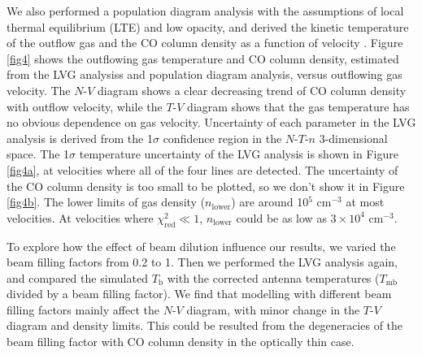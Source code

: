 We also performed a population diagram analysis with the assumptions of local thermal equilibrium (LTE) and low opacity, and derived the kinetic temperature of the outflow gas and the CO column density as a function of velocity \citep{1999ApJ...517..209G}. Figure \ref{fig4} shows the outflowing gas temperature and CO column density, estimated from the LVG analysiss and population diagram analysis, versus outflowing gas velocity. The $N$-$V$ diagram shows a clear decreasing trend of CO column density with outflow velocity, while the $T$-$V$ diagram shows that the gas temperature has no obvious dependence on gas velocity. Uncertainty of each parameter in the LVG analysis is derived from the 1$\sigma$ confidence region in the $N$-$T$-$n$ 3-dimensional space. The 1$\sigma$ temperature uncertainty of the LVG analysis is shown in Figure \ref{fig4a}, at velocities where all of the four lines are detected. The uncertainty of the CO column density is too small to be plotted, so we don't show it in Figure \ref{fig4b}. The lower limits of gas density ($n_{\mathrm{lower}}$) are around 10$^5$ cm$^{-3}$ at most velocities. At velocities where $\chi_{\mathrm{red}}^2 \ll 1$, $n_{\mathrm{lower}}$ could be as low as $3 \times 10^4$ cm$^{-3}$.

To explore how the effect of beam dilution influence our results, we varied the beam filling factors from 0.2 to 1. Then we performed the LVG analysis again, and compared the simulated $T_\mathrm{b}$ with the corrected antenna temperatures ($T_{\mathrm{mb}}$ divided by a beam filling factor). We find that modelling with different beam filling factors mainly affect the $N$-$V$ diagram, with minor change in the $T$-$V$ diagram and density limits. This could be resulted from the degeneracies of the beam filling factor with CO column density in the optically thin case. 




